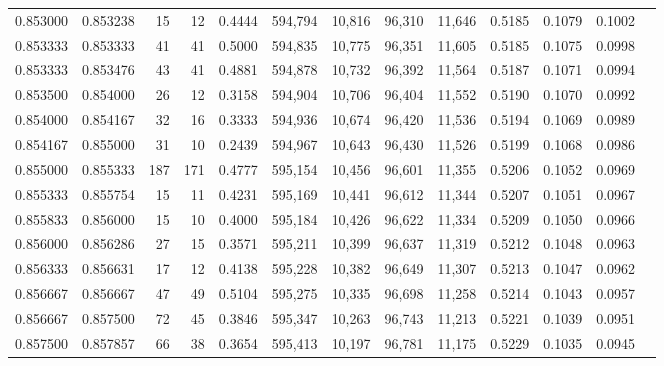 \begin{tabular}{rrrrrrrrrrrrr}
0.853000 & 0.853238 &    15 &  12 &                                     0.4444 & 594,794 &  10,816 &  96,310 &  11,646 & 0.5185 & 0.1079 & 0.1002 \\
0.853333 & 0.853333 &    41 &  41 &                                     0.5000 & 594,835 &  10,775 &  96,351 &  11,605 & 0.5185 & 0.1075 & 0.0998 \\
0.853333 & 0.853476 &    43 &  41 &                                     0.4881 & 594,878 &  10,732 &  96,392 &  11,564 & 0.5187 & 0.1071 & 0.0994 \\
0.853500 & 0.854000 &    26 &  12 &                                     0.3158 & 594,904 &  10,706 &  96,404 &  11,552 & 0.5190 & 0.1070 & 0.0992 \\
0.854000 & 0.854167 &    32 &  16 &                                     0.3333 & 594,936 &  10,674 &  96,420 &  11,536 & 0.5194 & 0.1069 & 0.0989 \\
0.854167 & 0.855000 &    31 &  10 &                                     0.2439 & 594,967 &  10,643 &  96,430 &  11,526 & 0.5199 & 0.1068 & 0.0986 \\
0.855000 & 0.855333 &   187 & 171 &                                     0.4777 & 595,154 &  10,456 &  96,601 &  11,355 & 0.5206 & 0.1052 & 0.0969 \\
0.855333 & 0.855754 &    15 &  11 &                                     0.4231 & 595,169 &  10,441 &  96,612 &  11,344 & 0.5207 & 0.1051 & 0.0967 \\
0.855833 & 0.856000 &    15 &  10 &                                     0.4000 & 595,184 &  10,426 &  96,622 &  11,334 & 0.5209 & 0.1050 & 0.0966 \\
0.856000 & 0.856286 &    27 &  15 &                                     0.3571 & 595,211 &  10,399 &  96,637 &  11,319 & 0.5212 & 0.1048 & 0.0963 \\
0.856333 & 0.856631 &    17 &  12 &                                     0.4138 & 595,228 &  10,382 &  96,649 &  11,307 & 0.5213 & 0.1047 & 0.0962 \\
0.856667 & 0.856667 &    47 &  49 &                                     0.5104 & 595,275 &  10,335 &  96,698 &  11,258 & 0.5214 & 0.1043 & 0.0957 \\
0.856667 & 0.857500 &    72 &  45 &                                     0.3846 & 595,347 &  10,263 &  96,743 &  11,213 & 0.5221 & 0.1039 & 0.0951 \\
0.857500 & 0.857857 &    66 &  38 &                                     0.3654 & 595,413 &  10,197 &  96,781 &  11,175 & 0.5229 & 0.1035 & 0.0945 \\

\end{tabular}
